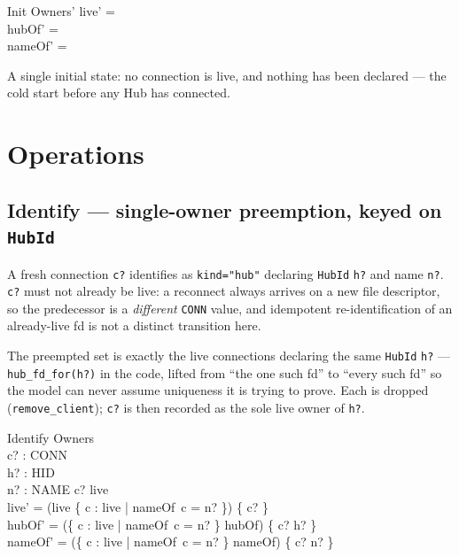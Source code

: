 \documentclass[a4paper,10pt,fleqn]{article}
\begin{document}
\begin{schema}{Init}
  Owners'
\where
  live' = \emptyset \\
  hubOf' = \emptyset \\
  nameOf' = \emptyset
\end{schema}

A single initial state: no connection is live, and nothing has been
declared --- the cold start before any Hub has connected.

\section{Operations}

\subsection{Identify --- single-owner preemption, keyed on \texttt{HubId}}

A fresh connection \texttt{c?} identifies as \texttt{kind="hub"} declaring
\texttt{HubId} \texttt{h?} and name \texttt{n?}.  \texttt{c?} must not
already be live: a reconnect always arrives on a new file descriptor, so
the predecessor is a \emph{different} \texttt{CONN} value, and idempotent
re-identification of an already-live fd is not a distinct transition here.

The preempted set is exactly the live connections declaring the same
\texttt{HubId} \texttt{h?} --- \texttt{hub\_fd\_for(h?)} in the code,
lifted from ``the one such fd'' to ``every such fd'' so the model can
never assume uniqueness it is trying to prove.  Each is dropped
(\texttt{remove\_client}); \texttt{c?} is then recorded as the sole live
owner of \texttt{h?}.

\begin{schema}{Identify}
  \Delta Owners \\
  c? : CONN \\
  h? : HID \\
  n? : NAME
\where
  c? \notin live \\
  live' = (live \setminus \{ c : live | nameOf~c = n? \}) \cup \{ c? \} \\
  hubOf' = (\{ c : live | nameOf~c = n? \} \ndres hubOf) \oplus \{ c? \mapsto h? \} \\
  nameOf' = (\{ c : live | nameOf~c = n? \} \ndres nameOf) \oplus \{ c? \mapsto n? \}
\end{schema}
\end{document}
